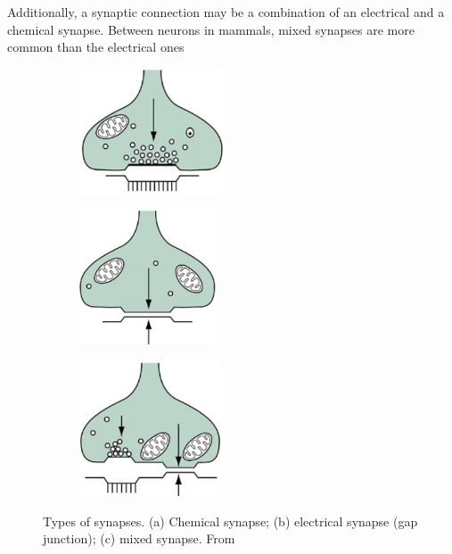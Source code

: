 \documentclass[class={myRUCProject}, crop=false]{standalone}
\begin{document}
Additionally, a synaptic connection may be a combination of an electrical and a chemical synapse. Between neurons in mammals, mixed synapses are more common than the electrical ones \cite{Hammond2015ch6}
\begin{figure}
    \centering
    \begin{subfigure}[t]{0.3\textwidth}
        \centering
        \caption{}
        \includegraphics[height=3.7cm]{Pictures/Anakin/chem.syn.png}
    \end{subfigure}
    \begin{subfigure}[t]{0.3\textwidth}
        \centering
        \caption{}
        \includegraphics[height=4cm]{Pictures/Anakin/el.syn.png}
    \end{subfigure}
    \begin{subfigure}[t]{0.3\textwidth}
        \centering
        \caption{}
        \includegraphics[height=4cm]{Pictures/Anakin/mix.syn.png}
    \end{subfigure}
    \caption{Types of synapses. (a) Chemical synapse; (b) electrical synapse (gap junction); (c) mixed synapse. From \cite{Hammond2015ch6}}\label{fig:synapses} 
\end{figure}
\end{document}
